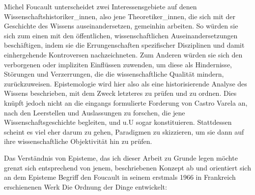 Michel Foucault unterscheidet zwei Interessensgebiete auf denen
Wissenschaftshistoriker\_innen, also jene Theoretiker\_innen, die sich mit der
Geschichte des Wissens auseinandersetzen, gemeinhin arbeiten. So würden sie sich
zum einen mit den öffentlichen, wissenschaftlichen Auseinandersetzungen
beschäftigen, indem sie die Errungenschaften spezifischer Disziplinen und damit
einhergehende Kontroversen nachzeichneten. Zum Anderen würden sie sich den
verborgenen oder impliziten Einflüssen zuwenden, um diese als Hindernisse,
Störungen und Verzerrungen, die die wissenschaftliche Qualität mindern,
zurückzuweisen.\footnotemark {} Epistemologie
wird hier also als eine historisierende Analyse des Wissens beschrieben, mit dem
Zweck letzteres zu prüfen und zu ordnen.  Dies knüpft jedoch nicht an die
eingangs formulierte Forderung von Castro Varela an, nach den Leerstellen und
Auslassungen zu forschen, die jene Wissenschaftsgeschichte begleiten, und u.U
sogar konstituieren. Stattdessen scheint es viel eher darum zu gehen, Paradigmen
zu skizzieren, um sie dann auf ihre wissenschaftliche Objektivität hin zu
prüfen.

Das Verständnis von Episteme, das ich dieser Arbeit zu Grunde legen möchte
grenzt sich entsprechend von jenem, beschriebenen Konzept ab und orientiert sich
an dem Episteme Begriff den Foucault in seinem erstmals 1966 in Frankreich
erschienenen Werk \glqq Die Ordnung der Dinge\grqq \footnotemark {} entwickelt: \\


